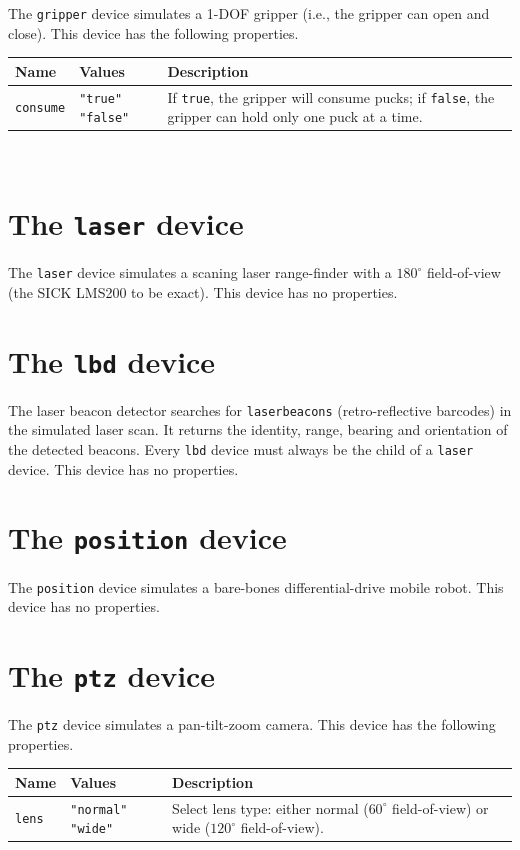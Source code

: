 \documentclass[11pt,twoside]{report}
\begin{document}
The {\tt gripper} device simulates a 1-DOF gripper (i.e., the gripper
can open and close).  This device has the following properties.
\vspace{1em}\\\noindent
\begin{tabularx}{\columnwidth}{llX}
\hline
Name & Values & Description \\
\hline

\verb'consume' & \verb'"true"' \verb'"false"' & If {\tt true}, the
gripper will consume pucks; if {\tt false}, the gripper can hold only
one puck at a time.\\

\hline
\end{tabularx}
\vspace{1em}\\


\newpage
\section{The {\tt laser} device}

The {\tt laser} device simulates a scaning laser range-finder with a
$180^\circ$ field-of-view (the SICK LMS200 to be exact).  This device
has no properties.


\newpage
\section{The {\tt lbd} device}

The laser beacon detector searches for {\tt laserbeacons}
(retro-reflective barcodes) in the simulated laser scan.  It returns
the identity, range, bearing and orientation of the detected beacons.
Every {\tt lbd} device must always be the child of a {\tt laser}
device.  This device has no properties.


\newpage
\section{The {\tt position} device}

The {\tt position} device simulates a bare-bones differential-drive
mobile robot.  This device has no properties.


\newpage
\section{The {\tt ptz} device}

The {\tt ptz} device simulates a pan-tilt-zoom camera.
This device has the following properties.
\vspace{1em}\\\noindent
\begin{tabularx}{\columnwidth}{llX}
\hline
Name & Values & Description \\
\hline

\verb'lens' & \verb'"normal"' \verb'"wide"' & Select lens type: either
normal ($60^\circ$ field-of-view) or wide ($120^\circ$
field-of-view).\\

\hline
\end{tabularx}
\vspace{1em}\\
\end{document}
